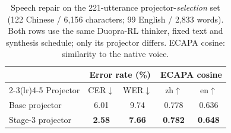 \begin{table}[tbp]
\centering\footnotesize
\setlength{\tabcolsep}{4.5pt}
\begin{tabular}{lcccc}
\toprule
\rowcolor{tablehead} & \multicolumn{2}{c}{Error rate (\%)} & \multicolumn{2}{c}{ECAPA cosine}\\
\cmidrule(lr){2-3}\cmidrule(lr){4-5}
\rowcolor{tablehead}Projector & CER$\downarrow$ & WER$\downarrow$ & zh$\uparrow$ & en$\uparrow$\\
\midrule
Base projector & 6.01 & 9.74 & 0.778 & 0.636\\
\rowcolor{oursfill}Stage-3 projector & \textbf{2.58} & \textbf{7.66} & \textbf{0.782} & \textbf{0.648}\\
\bottomrule
\end{tabular}
\caption{Speech repair on the 221-utterance projector-\emph{selection} set (122 Chinese / 6,156 characters; 99 English / 2,833 words). Both rows use the same Duopra-RL thinker, fixed text and synthesis schedule; only its projector differs. ECAPA cosine: similarity to the native voice.}
\label{tab:stage3-speech}
\end{table}

